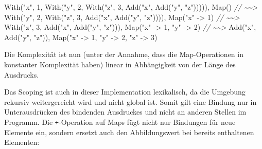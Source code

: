 \documentclass[]{article}
\newenvironment{Shaded}{}{}
\newcommand{\CommentTok}[1]{\textcolor[rgb]{0.38,0.63,0.69}{\textit{#1}}}
\newcommand{\DecValTok}[1]{\textcolor[rgb]{0.25,0.63,0.44}{#1}}
\newcommand{\FunctionTok}[1]{\textcolor[rgb]{0.02,0.16,0.49}{#1}}
\newcommand{\NormalTok}[1]{#1}
\newcommand{\StringTok}[1]{\textcolor[rgb]{0.25,0.44,0.63}{#1}}
\begin{document}
\begin{Shaded}
\begin{Highlighting}[]
\FunctionTok{With}\NormalTok{(}\StringTok{"x"}\NormalTok{, }\DecValTok{1}\NormalTok{, }\FunctionTok{With}\NormalTok{(}\StringTok{"y"}\NormalTok{, }\DecValTok{2}\NormalTok{, }\FunctionTok{With}\NormalTok{(}\StringTok{"z"}\NormalTok{, }\DecValTok{3}\NormalTok{, }\FunctionTok{Add}\NormalTok{(}\StringTok{"x"}\NormalTok{, }\FunctionTok{Add}\NormalTok{(}\StringTok{"y"}\NormalTok{, }\StringTok{"z"}\NormalTok{))))), Map()}
\CommentTok{// \textasciitilde{}\textasciitilde{}\textgreater{}}
\FunctionTok{With}\NormalTok{(}\StringTok{"y"}\NormalTok{, }\DecValTok{2}\NormalTok{, }\FunctionTok{With}\NormalTok{(}\StringTok{"z"}\NormalTok{, }\DecValTok{3}\NormalTok{, }\FunctionTok{Add}\NormalTok{(}\StringTok{"x"}\NormalTok{, }\FunctionTok{Add}\NormalTok{(}\StringTok{"y"}\NormalTok{, }\StringTok{"z"}\NormalTok{)))), Map(}\StringTok{"x"}\NormalTok{ {-}\textgreater{} }\DecValTok{1}\NormalTok{)}
\CommentTok{// \textasciitilde{}\textasciitilde{}\textgreater{}}
\FunctionTok{With}\NormalTok{(}\StringTok{"z"}\NormalTok{, }\DecValTok{3}\NormalTok{, }\FunctionTok{Add}\NormalTok{(}\StringTok{"x"}\NormalTok{, }\FunctionTok{Add}\NormalTok{(}\StringTok{"y"}\NormalTok{, }\StringTok{"z"}\NormalTok{))), Map(}\StringTok{"x"}\NormalTok{ {-}\textgreater{} }\DecValTok{1}\NormalTok{, }\StringTok{"y"}\NormalTok{ {-}\textgreater{} }\DecValTok{2}\NormalTok{)}
\CommentTok{// \textasciitilde{}\textasciitilde{}\textgreater{}}
\FunctionTok{Add}\NormalTok{(}\StringTok{"x"}\NormalTok{, }\FunctionTok{Add}\NormalTok{(}\StringTok{"y"}\NormalTok{, }\StringTok{"z"}\NormalTok{)), Map(}\StringTok{"x"}\NormalTok{ {-}\textgreater{} }\DecValTok{1}\NormalTok{, }\StringTok{"y"}\NormalTok{ {-}\textgreater{} }\DecValTok{2}\NormalTok{, }\StringTok{"z"}\NormalTok{ {-}\textgreater{} }\DecValTok{3}\NormalTok{)}
\end{Highlighting}
\end{Shaded}

Die Komplexität ist nun (unter der Annahme, dass die Map-Operationen in
konstanter Komplexität haben) linear in Abhängigkeit von der Länge des
Ausdrucks.

Das Scoping ist auch in dieser Implementation lexikalisch, da die
Umgebung rekursiv weitergereicht wird und nicht global ist. Somit gilt
eine Bindung nur in Unterausdrücken des bindenden Ausdruckes und nicht
an anderen Stellen im Programm. Die \texttt{+}-Operation auf Maps fügt
nicht nur Bindungen für neue Elemente ein, sondern ersetzt auch den
Abbildungswert bei bereits enthaltenen Elementen:
\end{document}

